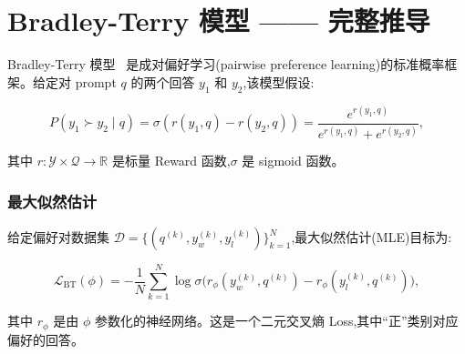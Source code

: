 \section{Bradley-Terry 模型 —— 完整推导}
\label{sec:bradley-terry}

Bradley-Terry 模型~\cite{bradley1952rank} 是成对偏好学习(pairwise preference learning)的标准概率框架。给定对 prompt $q$ 的两个回答 $y_1$ 和 $y_2$,该模型假设:

\[
P(y_1 \succ y_2 \mid q) = \sigma(r(y_1, q) - r(y_2, q))
    = \frac{e^{r(y_1,q)}}{e^{r(y_1,q)} + e^{r(y_2,q)}},
\]

其中 $r: \mathcal{Y} \times \mathcal{Q} \to \mathbb{R}$ 是标量 Reward 函数,$\sigma$ 是 sigmoid 函数。

\subsubsection*{最大似然估计}
\label{maximum-likelihood-estimation}

给定偏好对数据集 $\mathcal{D} = \{(q^{(k)}, y_w^{(k)}, y_l^{(k)})\}_{k=1}^N$,最大似然估计(MLE)目标为:

\[
\mathcal{L}_{\text{BT}}(\phi) =
    -\frac{1}{N}\sum_{k=1}^N \log \sigma\!\bigl(r_\phi(y_w^{(k)}, q^{(k)}) - r_\phi(y_l^{(k)}, q^{(k)})\bigr),
\]

其中 $r_\phi$ 是由 $\phi$ 参数化的神经网络。这是一个二元交叉熵 Loss,其中“正”类别对应偏好的回答。

